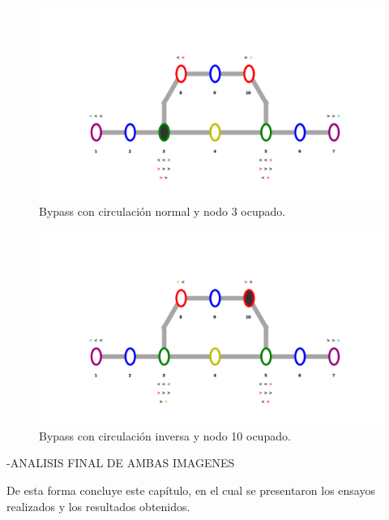 	\begin{figure}[h]
	\centering
	\includegraphics[scale=0.5]{./Figures/Mapa_A}
		\caption{Bypass con circulación normal y nodo 3 ocupado.}
		\label{fig:Bypass_5}
	\end{figure}

	\begin{figure}[h]
	\centering
	\includegraphics[scale=0.5]{./Figures/Mapa_B}
		\caption{Bypass con circulación inversa y nodo 10 ocupado.}
		\label{fig:Bypass_6}
	\end{figure}
	
	
	-ANALISIS FINAL DE AMBAS IMAGENES
	

	De esta forma concluye este capítulo, en el cual se presentaron los ensayos realizados y los resultados obtenidos.
